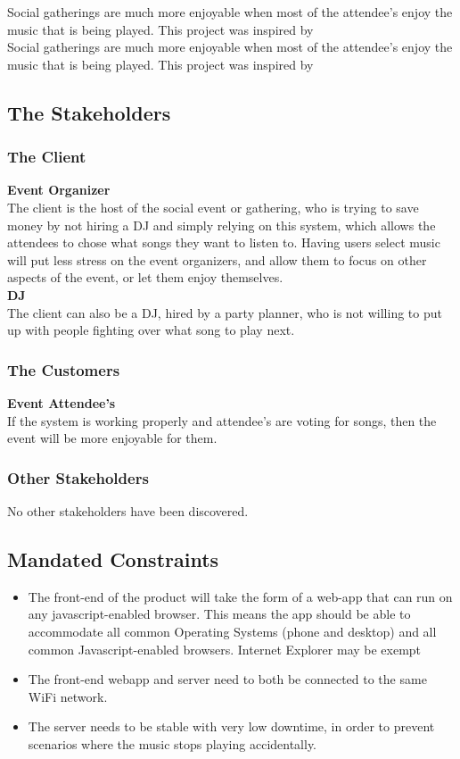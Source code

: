 \documentclass[12pt, titlepage]{article}
\begin{document}
Social gatherings are much more enjoyable when most of the attendee's enjoy
the music that is being played. This project was inspired by \\

Social gatherings are much more enjoyable when most of the attendee's enjoy
the music that is being played. This project was inspired by

\subsection{The Stakeholders}

\subsubsection{The Client}

\textbf{Event Organizer}\\
The client is the host of the social event or gathering, who is trying to save
money by not hiring a DJ and simply relying on this system, which allows the
attendees to chose what songs they want to listen to. Having users select music
will put less stress on the event organizers, and allow them to focus on other
aspects of the event, or let them enjoy themselves. \\ \textbf{DJ} \\ The client can also be a DJ, hired by a party planner, who is not willing to put up with people fighting over what song to play next.

\subsubsection{The Customers}

\textbf{Event Attendee's}\\
If the system is working properly and attendee's are voting for songs, then
the event will be more enjoyable for them.
\subsubsection{Other Stakeholders}


No other stakeholders have been discovered.

\subsection{Mandated Constraints}

\begin{itemize}
\item The front-end of the product will take the form of a web-app that can
run on any javascript-enabled browser. This means the app should be able to
accommodate all common Operating Systems (phone and desktop) and all
common Javascript-enabled browsers. Internet Explorer may be exempt
\item The front-end webapp and server need to both be connected to the same
WiFi network.
\item The server needs to be stable with very low downtime, in order to prevent
scenarios where the music stops playing accidentally.
\end{itemize}
\end{document}

